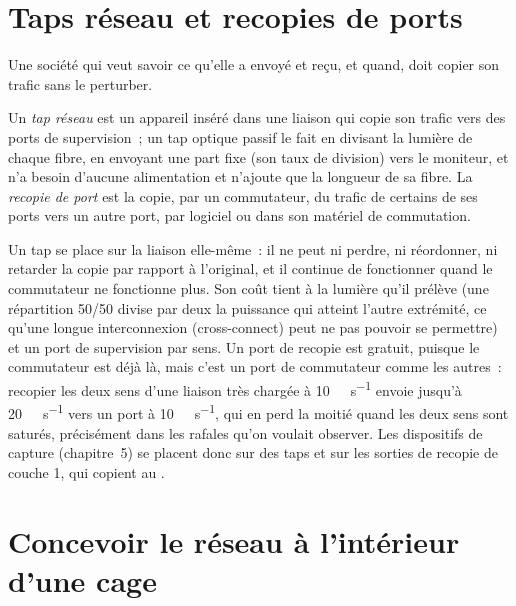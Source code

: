 \section{Taps réseau et recopies de ports}

Une société qui veut savoir ce qu'elle a envoyé et reçu, et quand, doit copier son trafic sans le perturber.

\begin{definition}\label{def:nw:switches-and-layer-1-devices:tap}
Un \emph{tap réseau} est un appareil inséré dans une liaison qui copie son trafic vers des ports de supervision~; un tap optique passif
le fait en divisant la lumière de chaque fibre, en envoyant une part fixe (son taux de division) vers le moniteur, et n'a besoin
d'aucune alimentation et n'ajoute que la longueur de sa fibre. La \emph{recopie de port} est la copie, par un commutateur, du trafic de certains de
ses ports vers un autre port, par logiciel ou dans son matériel de commutation.
\end{definition}

Un tap se place sur la liaison elle-même~: il ne peut ni perdre, ni réordonner, ni retarder la copie par rapport à l'original, et il continue de fonctionner quand le
commutateur ne fonctionne plus. Son coût tient à la lumière qu'il prélève (une répartition 50/50 divise par deux la puissance qui atteint l'autre extrémité, ce qu'une longue interconnexion (cross-connect)
peut ne pas pouvoir se permettre) et un port de supervision par sens. Un port de recopie est gratuit, puisque le commutateur est déjà là, mais
c'est un port de commutateur comme les autres~: recopier les deux sens d'une liaison très chargée à \qty{10}{\giga\bit\per\second} envoie jusqu'à
\qty{20}{\giga\bit\per\second} vers un port à \qty{10}{\giga\bit\per\second}, qui en perd la moitié quand les deux sens sont saturés, précisément dans les
rafales qu'on voulait observer. Les dispositifs de capture (chapitre~5) se placent donc sur des taps et sur les sorties de recopie de couche 1, qui copient au
.

\section{Concevoir le réseau à l'intérieur d'une cage}

